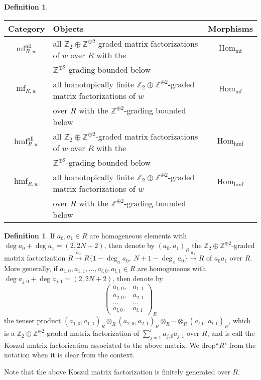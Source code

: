 \documentclass{amsart}
\theoremstyle{plain}
\theoremstyle{definition}
\newtheorem{definition}[theorem]{Definition}
\theoremstyle{remark}
\numberwithin{equation}{section}
\begin{document}
\begin{definition}
\begin{center}
\small{
\begin{tabular}{|c|l|c|}
\hline
Category & Objects & Morphisms \\
\hline
${\mathrm{mf}}^{\mathrm{all}}_{R,w}$ & all ${\mathbb{Z}}_2\oplus{\mathbb{Z}}^{\oplus2}$-graded matrix factorizations of $w$ over $R$ with the   & ${\mathrm{Hom}}_{\mathrm{mf}}$ \\
 & ${\mathbb{Z}}^{\oplus2}$-grading bounded below &  \\
\hline
${\mathrm{mf}}_{R,w}$ & all homotopically finite ${\mathbb{Z}}_2\oplus{\mathbb{Z}}^{\oplus2}$-graded matrix factorizations of $w$    & ${\mathrm{Hom}}_{\mathrm{mf}}$ \\
 & over $R$ with the ${\mathbb{Z}}^{\oplus2}$-grading bounded below &  \\
\hline
${\mathrm{hmf}}^{\mathrm{all}}_{R,w}$ & all ${\mathbb{Z}}_2\oplus{\mathbb{Z}}^{\oplus2}$-graded matrix factorizations of $w$ over $R$ with the   & ${\mathrm{Hom}}_{\mathrm{hmf}}$ \\
 & ${\mathbb{Z}}^{\oplus2}$-grading bounded below &  \\
\hline
${\mathrm{hmf}}_{R,w}$ & all homotopically finite ${\mathbb{Z}}_2\oplus{\mathbb{Z}}^{\oplus2}$-graded matrix factorizations of $w$    & ${\mathrm{Hom}}_{\mathrm{hmf}}$ \\
 & over $R$ with the ${\mathbb{Z}}^{\oplus2}$-grading bounded below &  \\
\hline
\end{tabular}
}
\end{center}
\end{definition}

\begin{definition}\label{def-koszul-mf}
If $a_0,a_1\in R$ are homogeneous elements with $\deg a_0 +\deg a_1=(2,2N+2)$, then denote by $(a_0,a_1)_R$ the ${\mathbb{Z}}_2\oplus{\mathbb{Z}}^{\oplus2}$-graded matrix factorization $R \xrightarrow{a_0} R\{1-\deg_a a_0,~N+1-\deg_x{a_0}\} \xrightarrow{a_1} R$ of $a_0a_1$ over $R$. More generally, if $a_{1,0},a_{1,1},\dots,a_{l,0},a_{l,1}\in R$ are homogeneous with $\deg a_{j,0} +\deg a_{j,1}=(2,2N+2)$, then denote by 
\[
\left(\begin{array}{cc}
  a_{1,0}, & a_{1,1} \\
  a_{2,0}, & a_{2,1} \\
  \dots & \dots \\
  a_{l,0}, & a_{l,1}
\end{array}\right)_R
\]
the tenser product $(a_{1,0},a_{1,1})_R \otimes_R (a_{2,0},a_{2,1})_R \otimes_R \cdots \otimes_R (a_{l,0},a_{l,1})_R$, which is a ${\mathbb{Z}}_2\oplus{\mathbb{Z}}^{\oplus2}$-graded matrix factorization of $\sum_{j=1}^l a_{j,0} a_{j,1}$ over $R$, and is call the Koszul matrix factorization associated to the above matrix. We drop``$R$" from the notation when it is clear from the context. 

Note that the above Koszul matrix factorization is finitely generated over $R$.
\end{definition}
\end{document}
